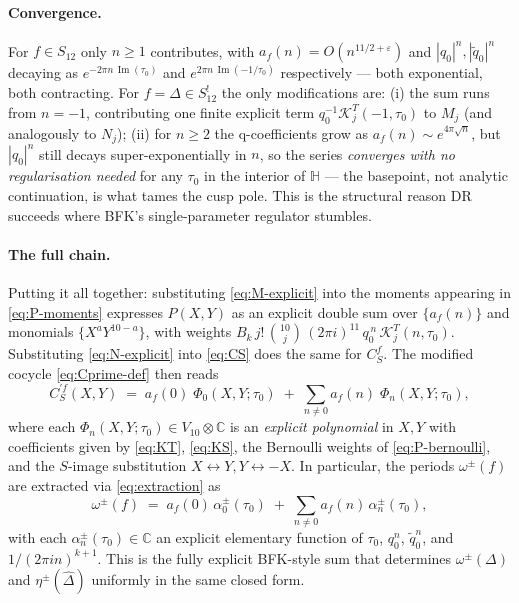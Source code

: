 \documentclass[11pt,letterpaper]{article}
\newcommand{\HH}{\mathbb{H}}
\newcommand{\CC}{\mathbb{C}}
\newcommand{\Dhat}{\widehat{\Delta}}
\newcommand{\eps}{\varepsilon}
\DeclareMathOperator{\im}{Im}
\begin{document}
\paragraph{Convergence.}
For $f \in S_{12}$ only $n \ge 1$ contributes, with $a_f(n) = O(n^{11/2+\eps})$
and $|q_0|^n, |\widetilde q_0|^n$ decaying as $e^{-2\pi n\,\im(\tau_0)}$ and
$e^{2\pi n\,\im(-1/\tau_0)}$ respectively — both exponential, both contracting.
For $f = \Dhat \in S_{12}^!$ the only modifications are: (i) the sum runs from
$n = -1$, contributing one finite explicit term $q_0^{-1}\mathcal{K}^T_j(-1,\tau_0)$
to $M_j$ (and analogously to $N_j$); (ii) for $n \ge 2$ the q-coefficients grow
as $a_f(n) \sim e^{4\pi\sqrt n}$, but $|q_0|^n$ still decays super-exponentially
in $n$, so the series \emph{converges with no regularisation needed} for any
$\tau_0$ in the interior of $\HH$ — the basepoint, not analytic continuation,
is what tames the cusp pole.  This is the structural reason DR succeeds where
BFK's single-parameter regulator stumbles.

\paragraph{The full chain.}
Putting it all together: substituting \eqref{eq:M-explicit} into the moments
appearing in \eqref{eq:P-moments} expresses $P(X,Y)$ as an explicit double
sum over $\{a_f(n)\}$ and monomials $\{X^aY^{10-a}\}$, with weights
\(B_k\,j!\,\binom{10}{j}\,(2\pi i)^{11}\,q_0^{\,n}\,\mathcal{K}^T_j(n,\tau_0)\).
Substituting \eqref{eq:N-explicit} into \eqref{eq:CS} does the same for
$C_S^f$.  The modified cocycle \eqref{eq:Cprime-def} then reads
\begin{equation}\label{eq:Cprime-master}
  \boxed{\;
  C^{\prime f}_S(X,Y) \;=\;
    a_f(0)\;\Phi_0(X,Y;\tau_0)
    \;+\; \sum_{n \ne 0} a_f(n)\;\Phi_n(X,Y;\tau_0),
  \;}
\end{equation}
where each $\Phi_n(X,Y;\tau_0) \in V_{10}\otimes\CC$ is an \emph{explicit
polynomial} in $X, Y$ with coefficients given by \eqref{eq:KT},
\eqref{eq:KS}, the Bernoulli weights of \eqref{eq:P-bernoulli}, and the
$S$-image substitution $X \leftrightarrow Y, Y \leftrightarrow -X$.  In
particular, the periods $\omega^\pm(f)$ are extracted via \eqref{eq:extraction}
as
\begin{equation}\label{eq:omega-master}
  \omega^\pm(f) \;=\; a_f(0)\,\alpha_0^\pm(\tau_0) \;+\;
                       \sum_{n\ne 0} a_f(n)\,\alpha_n^\pm(\tau_0),
\end{equation}
with each $\alpha_n^\pm(\tau_0) \in \CC$ an explicit elementary function of
$\tau_0$, $q_0^n$, $\widetilde q_0^n$, and $1/(2\pi i n)^{k+1}$.  This is the
fully explicit BFK-style sum that determines $\omega^\pm(\Delta)$ and
$\eta^\pm(\Dhat)$ uniformly in the same closed form.
\end{document}
